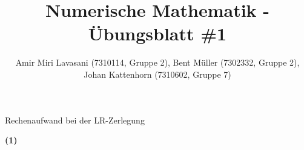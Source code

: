 \documentclass[10pt]{article}
\newenvironment{Aufgabe}[2][Aufgabe]{\begin{trivlist}
\item[\hskip \labelsep {\bfseries #1}\hskip \labelsep {\bfseries #2.}]}{\end{trivlist}}
\begin{document}
 
\title{ \textbf{Numerische Mathematik - Übungsblatt \#1} }

\author{Amir Miri Lavasani (7310114, Gruppe 2), Bent Müller (7302332, Gruppe 2), \\ 
Johan Kattenhorn (7310602, Gruppe 7)} \maketitle

 
\begin{Aufgabe}{3}
	Rechenaufwand bei der LR-Zerlegung
\end{Aufgabe}

\textbf{(1)}
\end{document}
